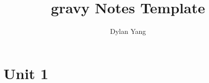 \documentclass[nodate]{gravyreprt}
\title{gravy Notes Template}
\author{Dylan Yang}
\begin{document}
\maketitle

\tableofcontents

\chapter{Unit 1}



\end{document}
